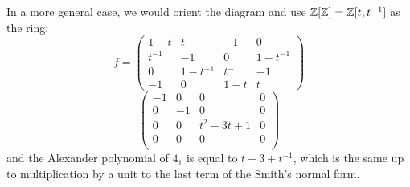 \begin{example}
\begin{center}
  \end{center}
  In a more general case, we would orient the diagram and use $\operatorname{\mathbb{Z}}[\operatorname{\mathbb{Z}}]=\operatorname{\mathbb{Z}}[t, t^{-1}]$ as the ring:
  $$
  f=\begin{pmatrix}
    1-t & t & -1 & 0 \\ 
    t^{-1} & -1 & 0 & 1-t^{-1}\\ 
    0 & 1-t^{-1} & t^{-1} & -1\\ 
    -1 & 0 & 1-t & t
  \end{pmatrix}
  $$
  $$
  \begin{pmatrix}
    -1 & 0 & 0 & 0 \\
    0 & -1 & 0 & 0\\ 
    0 & 0 & t^2-3t+1 & 0\\ 
    0 & 0 & 0 & 0\\ 
  \end{pmatrix}
  $$
  and the Alexander polynomial of $4_1$ is equal to $t-3+t^{-1}$, which is the same up to multiplication by a unit to the last term of the Smith's normal form.
\end{example}














